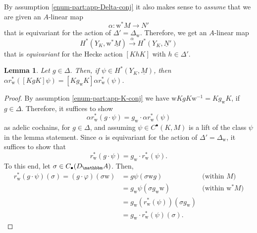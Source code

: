 \documentclass[10pt, twoside]{amsart}
\theoremstyle{plain}
\newtheorem{lemma}[theorem]{Lemma}
\theoremstyle{definition}
\theoremstyle{remark}
\numberwithin{equation}{subsection}
\def\A{\mathbbm A}
\begin{document}
\begin{appendix}
By assumption \ref{enum-part:app-Delta-conj} it also makes sense to {\em assume} that we are given an $A$-linear map
\begin{equation}\label{eqn:app-alpha}
\alpha : {{ \boldsymbol{\mathrm{w}}}}^{\ast}M \rightarrow N'
\end{equation}
that is equivariant for the action of $\Delta'=\Delta_{{ \boldsymbol{\mathrm{w}}}}$. Therefore, we get an $A$-linear map 
$$
H^{\ast}(Y_K,{{ \boldsymbol{\mathrm{w}}}}^{\ast}\underline M) \xrightarrow{\alpha} H^{\ast}(Y_K,\underline N')
$$ 
that is {\em equivariant} for the Hecke action $[KhK]$ with $h \in \Delta'$.
\begin{lemma}\label{lemma:app-alpha-rtau-hecke}
Let $g \in \Delta$. Then, if $\psi \in H^{\ast}(Y_K,\underline M)$, then $\alpha r_{{ \boldsymbol{\mathrm{w}}}}^{\ast}([KgK]\psi) = [Kg_{{ \boldsymbol{\mathrm{w}}}} K]\alpha r_{{ \boldsymbol{\mathrm{w}}}}^{\ast}(\psi)$.
\end{lemma}
\begin{proof}
By assumption \ref{enum-part:app-K-conj} we have ${{ \boldsymbol{\mathrm{w}}}} KgK {{ \boldsymbol{\mathrm{w}}}}^{-1} = Kg_{{ \boldsymbol{\mathrm{w}}}} K$, if $g \in \Delta$. Therefore, it suffices to show
$$
\alpha r_{{ \boldsymbol{\mathrm{w}}}}^{\ast}(g\cdot \psi) = g_{{ \boldsymbol{\mathrm{w}}}} \cdot \alpha r_{{ \boldsymbol{\mathrm{w}}}}^{\ast}(\psi)
$$
as adelic cochains, for $g \in \Delta$, and assuming $\psi \in C^{\bullet}(K,M)$ is a lift of the class $\psi$ in the lemma statement. Since $\alpha$ is equivariant for the action of $\Delta' = \Delta_{{ \boldsymbol{\mathrm{w}}}}$, it suffices to show that
$$
r_{{ \boldsymbol{\mathrm{w}}}}^{\ast}(g \cdot \psi) = g_{{ \boldsymbol{\mathrm{w}}}} \cdot r_{{ \boldsymbol{\mathrm{w}}}}^{\ast}(\psi).
$$
To this end, let $\sigma \in C_{\bullet}(D_\A)$.  Then,
\begin{align*}
r_{{ \boldsymbol{\mathrm{w}}}}^{\ast}(g\cdot \psi)(\sigma) = (g\cdot \varphi)(\sigma {{ \boldsymbol{\mathrm{w}}}}) 
&= g \psi(\sigma {{ \boldsymbol{\mathrm{w}}}} g) & \text{(within $M$)}\\
&= g_{{ \boldsymbol{\mathrm{w}}}} \psi(\sigma g_{{ \boldsymbol{\mathrm{w}}}} {{ \boldsymbol{\mathrm{w}}}}) & \text{(within ${{ \boldsymbol{\mathrm{w}}}}^{\ast}M$)}\\
&= g_{{ \boldsymbol{\mathrm{w}}}} (r_{{ \boldsymbol{\mathrm{w}}}}^{\ast}(\psi))(\sigma g_{{ \boldsymbol{\mathrm{w}}}})\\
&= g_{{ \boldsymbol{\mathrm{w}}}} \cdot r_{{ \boldsymbol{\mathrm{w}}}}^{\ast}(\psi)(\sigma).

\end{align*}
\end{proof}
\end{appendix}
\end{document}
